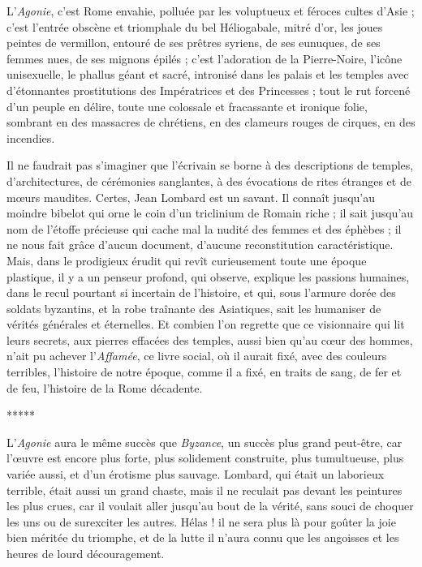 \documentclass[a4paper, 11pt, oneside, polutonikogreek, french]{article}
\begin{document}
L'\emph{Agonie}, c'est Rome envahie, polluée par les voluptueux et féroces cultes d'Asie ; c'est l'entrée obscène et triomphale du bel Héliogabale, mitré d'or, les joues peintes de vermillon, entouré de ses prêtres syriens, de ses eunuques, de ses femmes nues, de ses mignons épilés ; c'est l'adoration de la Pierre-Noire, l'icône unisexuelle, le phallus géant et sacré, intronisé dans les palais et les temples avec d'étonnantes prostitutions des Impératrices et des Princesses ; tout le rut forcené d'un peuple en délire, toute une colossale et fracassante et ironique folie, sombrant en des massacres de chrétiens, en des clameurs rouges de cirques, en des incendies.

Il ne faudrait pas s'imaginer que l'écrivain se borne à des descriptions de temples, d'architectures, de cérémonies sanglantes, à des évocations de rites étranges et de mœurs maudites. Certes, Jean Lombard est un savant. Il connaît jusqu'au moindre bibelot qui orne le coin d'un triclinium de Romain riche ; il sait jusqu'au nom de l'étoffe précieuse qui cache mal la nudité des femmes et des éphèbes ; il ne nous fait grâce d'aucun document, d'aucune reconstitution caractéristique. Mais, dans le prodigieux érudit qui revît curieusement toute une époque plastique, il y a un penseur profond, qui observe, explique les passions humaines, dans le recul pourtant si incertain de l'histoire, et qui, sous l'armure dorée des soldats byzantins, et la robe traînante des Asiatiques, sait les humaniser de vérités générales et éternelles. Et combien l'on regrette que ce visionnaire qui lit leurs secrets, aux pierres effacées des temples, aussi bien qu'au cœur des hommes, n'ait pu achever l'\emph{Affamée}, ce livre social, où il aurait fixé, avec des couleurs terribles, l'histoire de notre époque, comme il a fixé, en traits de sang, de fer et de feu, l'histoire de la Rome décadente.

\bigskip
\centerline{*\hspace{15mm}*\hspace{15mm}*\hspace{15mm}*\hspace{15mm}*}
\bigskip

L'\emph{Agonie} aura le même succès que \emph{Byzance}, un succès plus grand peut-être, car l'œuvre est encore plus forte, plus solidement construite, plus tumultueuse, plus variée aussi, et d'un érotisme plus sauvage. Lombard, qui était un laborieux terrible, était aussi un grand chaste, mais il ne reculait pas devant les peintures les plus crues, car il voulait aller jusqu'au bout de la vérité, sans souci de choquer les uns ou de surexciter les autres. Hélas ! il ne sera plus là pour goûter la joie bien méritée du triomphe, et de la lutte il n'aura connu que les angoisses et les heures de lourd découragement.
\end{document}
